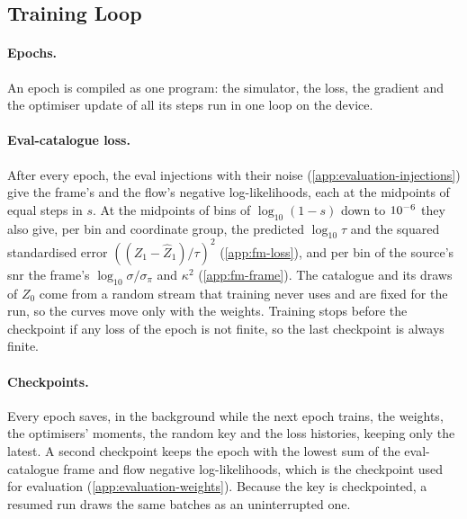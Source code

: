 \subsection{Training Loop}
\label{app:training-loop}

\paragraph{Epochs.}
An epoch is  compiled as one program: the simulator, the loss, the
gradient and the optimiser update of all its steps run in one loop on the device.

\paragraph{Eval-catalogue loss.}
After every epoch, the \EvaluationInjections{} eval injections with their noise
(\cref{app:evaluation-injections}) give the frame's and the flow's negative log-likelihoods, each
at the midpoints of \FlowMatchingLossBins{} equal steps in $s$. At the midpoints of
\FlowMatchingLossBins{} bins of $\log_{10}(1-s)$ down to $10^{-6}$ they also
give, per bin and coordinate group, the predicted $\log_{10}\tau$ and the squared standardised
error $((Z_1-\hat Z_1)/\tau)^2$ (\cref{app:fm-loss}), and per bin of the source's \ac{snr} the
frame's $\log_{10}\sigma/\sigma_\pi$ and $\kappa^2$ (\cref{app:fm-frame}). The catalogue and its
draws of $Z_0$ come from a random stream that training never uses and are fixed for the run, so the
curves move only with the weights. Training stops before the checkpoint if any loss of the epoch is
not finite, so the last checkpoint is always finite.

\paragraph{Checkpoints.}
Every epoch saves, in the background while the next epoch trains, the weights, the optimisers'
moments, the random key and the loss histories, keeping only the latest. A second checkpoint keeps
the epoch with the lowest sum of the eval-catalogue frame and flow negative log-likelihoods, which
is the checkpoint used for evaluation (\cref{app:evaluation-weights}). Because the key is
checkpointed, a resumed run draws the same batches as an uninterrupted one.

